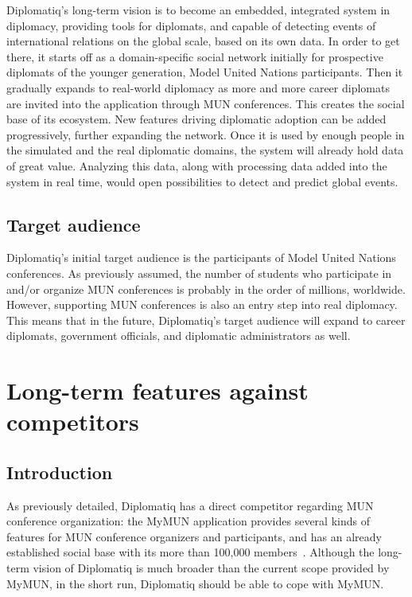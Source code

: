 Diplomatiq's long-term vision is to become an embedded, integrated system in diplomacy, providing tools for diplomats, and capable of detecting events of international relations on the global scale, based on its own data. In order to get there, it starts off as a domain-specific social network initially for prospective diplomats of the younger generation, Model United Nations participants. Then it gradually expands to real-world diplomacy as more and more career diplomats are invited into the application through MUN conferences. This creates the social base of its ecosystem. New features driving diplomatic adoption can be added progressively, further expanding the network. Once it is used by enough people in the simulated and the real diplomatic domains, the system will already hold data of great value. Analyzing this data, along with processing data added into the system in real time, would open possibilities to detect and predict global events.

\subsection{Target audience}

Diplomatiq's initial target audience is the participants of Model United Nations conferences. As previously assumed, the number of students who participate in and/or organize MUN conferences is probably in the order of millions, worldwide. However, supporting MUN conferences is also an entry step into real diplomacy. This means that in the future, Diplomatiq's target audience will expand to career diplomats, government officials, and diplomatic administrators as well.

\section{Long-term features against competitors}

\subsection{Introduction}

As previously detailed, Diplomatiq has a direct competitor regarding MUN conference organization: the MyMUN application provides several kinds of features for MUN conference organizers and participants, and has an already established social base with its more than 100,000 members~\cite{mymunwebsite}. Although the long-term vision of Diplomatiq is much broader than the current scope provided by MyMUN, in the short run, Diplomatiq should be able to cope with MyMUN.

